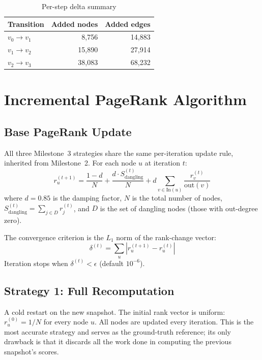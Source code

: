 \documentclass[11pt,a4paper]{article}
\begin{document}
\begin{table}[H]
\centering
\caption{Per-step delta summary}
\label{tab:deltas}
\begin{tabular}{lrr}
\toprule
\textbf{Transition} & \textbf{Added nodes} & \textbf{Added edges} \\
\midrule
$v_0 \to v_1$ & 8{,}756  & 14{,}883 \\
$v_1 \to v_2$ & 15{,}890 & 27{,}914 \\
$v_2 \to v_3$ & 38{,}083 & 68{,}232 \\
\bottomrule
\end{tabular}
\end{table}

\section{Incremental PageRank Algorithm}
\label{sec:incremental_pagerank}

\subsection{Base PageRank Update}
All three Milestone~3 strategies share the same per-iteration update
rule, inherited from Milestone~2. For each node $u$ at iteration $t$:
\begin{equation}
r_u^{(t+1)} = \frac{1-d}{N} + \frac{d \cdot S_{\text{dangling}}^{(t)}}{N} + d \sum_{v \in \mathrm{In}(u)} \frac{r_v^{(t)}}{\mathrm{out}(v)}
\label{eq:pagerank}
\end{equation}
where $d = 0.85$ is the damping factor, $N$ is the total number of
nodes, $S_{\text{dangling}}^{(t)} = \sum_{j \in D} r_j^{(t)}$, and $D$
is the set of dangling nodes (those with out-degree zero).

The convergence criterion is the $L_1$ norm of the rank-change vector:
\begin{equation}
\delta^{(t)} = \sum_u \left| r_u^{(t+1)} - r_u^{(t)} \right|
\end{equation}
Iteration stops when $\delta^{(t)} < \epsilon$ (default $10^{-6}$).

\subsection{Strategy 1: Full Recomputation}
A cold restart on the new snapshot. The initial rank vector is uniform:
$r_u^{(0)} = 1/N$ for every node $u$. All nodes are updated every
iteration. This is the most accurate strategy and serves as the
ground-truth reference; its only drawback is that it discards all the
work done in computing the previous snapshot's scores.
\end{document}
